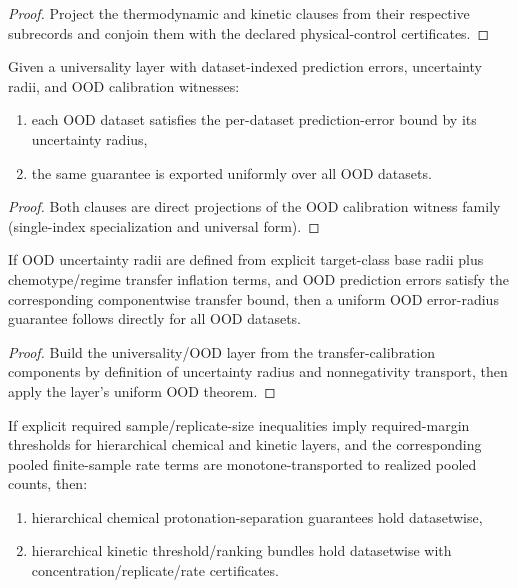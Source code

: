 \begin{proof}
Project the thermodynamic and kinetic clauses from their respective subrecords and conjoin them with the declared physical-control certificates.
\end{proof}

\begin{theorem}\label{thm:universality-ood-calibration-bounds}
Given a universality layer with dataset-indexed prediction errors, uncertainty radii, and OOD calibration witnesses:
\begin{enumerate}
\item each OOD dataset satisfies the per-dataset prediction-error bound by its uncertainty radius,
\item the same guarantee is exported uniformly over all OOD datasets.
\end{enumerate}
\end{theorem}

\begin{proof}
Both clauses are direct projections of the OOD calibration witness family (single-index specialization and universal form).
\end{proof}

\begin{theorem}\label{thm:ood-transfer-calibration-derived}
If OOD uncertainty radii are defined from explicit target-class base radii plus chemotype/regime transfer inflation terms, and OOD prediction errors satisfy the corresponding componentwise transfer bound, then a uniform OOD error-radius guarantee follows directly for all OOD datasets.
\end{theorem}

\begin{proof}
Build the universality/OOD layer from the transfer-calibration components by definition of uncertainty radius and nonnegativity transport, then apply the layer's uniform OOD theorem.
\end{proof}

\begin{theorem}\label{thm:finite-sample-complexity-inversion}
If explicit required sample/replicate-size inequalities imply required-margin thresholds for hierarchical chemical and kinetic layers, and the corresponding pooled finite-sample rate terms are monotone-transported to realized pooled counts, then:
\begin{enumerate}
\item hierarchical chemical protonation-separation guarantees hold datasetwise,
\item hierarchical kinetic threshold/ranking bundles hold datasetwise with concentration/replicate/rate certificates.
\end{enumerate}
\end{theorem}

